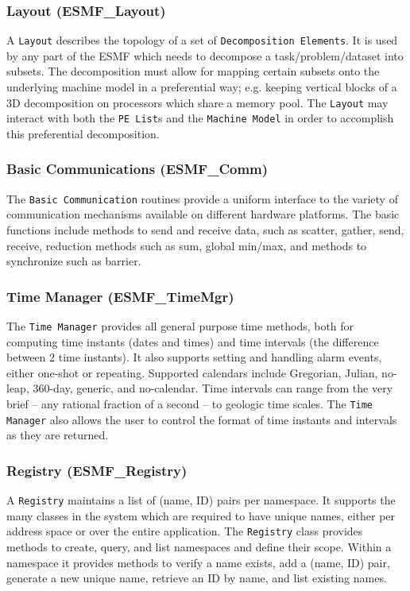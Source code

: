 \subsubsection{Layout (ESMF\_Layout)}
\label{sec:layout} 
A {\tt Layout} describes the topology of a set of {\tt Decomposition 
Elements}.
It is used by any part of the ESMF which needs
to decompose a task/problem/dataset into subsets.
The decomposition must allow for mapping certain subsets onto the
underlying machine model in a preferential way; e.g. keeping
vertical blocks of a 3D decomposition on processors which share
a memory pool.
The {\tt Layout} may interact with both the {\tt PE List}s
and the {\tt Machine Model} in order to accomplish this preferential
decomposition.

\subsubsection{Basic Communications (ESMF\_Comm)}
\label{sec:basiccomm} 
The {\tt Basic Communication} routines provide a uniform 
interface to the variety of communication mechanisms available
on different hardware platforms.  
The basic functions include methods to send
and receive data, such as scatter, gather, send, receive,
reduction methods such as sum, global min/max, and methods
to synchronize such as barrier. 

\subsubsection{Time Manager (ESMF\_TimeMgr)}
\label{sec:timemgr} 
The {\tt Time Manager} provides all general purpose time methods, both
for computing time instants (dates and times) and time intervals
(the difference between 2 time instants).   It also supports 
setting and handling alarm events, either one-shot or repeating.
Supported calendars include Gregorian, Julian, no-leap, 360-day, 
generic, and no-calendar.
Time intervals can range from the very brief -- any rational fraction
of a second -- to geologic time scales.
The {\tt Time Manager} also allows the user to control the format of
time instants and intervals as they are returned.

\subsubsection{Registry (ESMF\_Registry)}
\label{sec:registry} 
A {\tt Registry} maintains a list of (name, ID) pairs per 
namespace.  It supports the many classes in the system which are
required to have unique names, either per address space or over the entire
application.  The {\tt Registry} class provides methods to
create, query, and list namespaces and define their scope.  
Within a namespace it provides methods to
verify a name exists, add a (name, ID) pair,
generate a new unique name, retrieve an ID by name, 
and list existing names.

